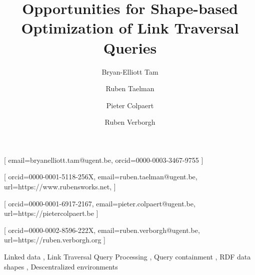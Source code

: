 \documentclass[
]{ceurart}
\begin{document}


\title{Opportunities for Shape-based Optimization of Link Traversal Queries}


\author[1]{Bryan-Elliott Tam}[%
email=bryanelliott.tam@ugent.be,
orcid=0000-0003-3467-9755
]
\cormark[1]

\author[1]{Ruben Taelman}[%
orcid=0000-0001-5118-256X,
email=ruben.taelman@ugent.be,
url=https://www.rubensworks.net,
]
\author[1]{Pieter Colpaert}[%
orcid=0000-0001-6917-2167,
email=pieter.colpaert@ugent.be,
url=https://pietercolpaert.be
]
\author[1]{Ruben Verborgh}[%
orcid=0000-0002-8596-222X,
email=ruben.verborgh@ugent.be,
url=https://ruben.verborgh.org
]



\address[1]{IDLab,
Department of Electronics and Information Systems, Ghent University – imec}

\begin{keywords}
  Linked data \sep
  Link Traversal Query Processing \sep
  Query containment \sep
  RDF data shapes \sep
  Descentralized environments
\end{keywords}

\maketitle










\end{document}
